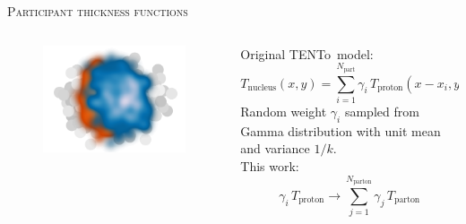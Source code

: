 \documentclass[aspectratio=169]{beamer}
\newcommand{\trento}{T\raisebox{-0.3ex}{R}ENTo}
\begin{document}
\begin{frame}[t]{\scshape Participant thickness functions}
  \begin{columns}[T]
    \begin{column}{.5\textwidth}
      \begin{figure}
        \includegraphics[width=\textwidth]{trento_thickness}
      \end{figure}
    \end{column}
    \begin{column}{.5\textwidth}
      \centering \bigskip
      \textcolor{theme}{Original \trento\ model:}
      \begin{equation*}
        T_\text{nucleus}(x, y) = \sum\limits_{i=1}^{N_\text{part}}
        \gamma_i\, T_\text{proton}(x - x_i, y - y_i)
      \end{equation*}
      {\small Random weight $\gamma_i$ sampled from Gamma distribution with unit mean
      and variance $1/k$.}\\[2ex]
      \textcolor{theme}{This work:}
      \begin{equation*}
        \gamma_i\, T_\text{proton} \rightarrow \sum\limits_{j=1}^{N_\text{parton}}
        \gamma_j\,T_\text{parton} 
      \end{equation*}
    \end{column}
  \end{columns}
\end{frame}
\end{document}
